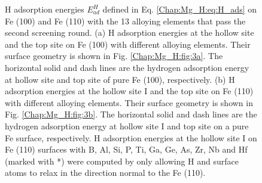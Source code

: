 \newpage
\begingroup
\begin{figure}[!ht]
  \centering
  \label{Chap:Mg_H:fig:8a}
  \label{Chap:Mg_H:fig:8b}
\caption[H adsorption energies on Fe (100) and Fe (110) with the 13 alloying elements that pass the second screening round]{H adsorption energies $E_{ad}^H$ defined in Eq. \ref{Chap:Mg_H:eq:H_ads} on Fe (100) and Fe (110) with the 13 alloying elements that pass the second screening round.  (a) H adsorption energies at the hollow site and the top site on Fe (100) with different alloying elements. Their surface geometry is shown in Fig. \ref{Chap:Mg_H:fig:3a}. The horizontal solid and dash lines are the hydrogen adsorption energy at hollow site and top site of pure Fe (100), respectively. (b) H adsorption energies at the hollow site I and the top site on Fe (110) with different alloying elements. Their surface geometry is shown in Fig. \ref{Chap:Mg_H:fig:3b}. The horizontal solid and dash lines are the hydrogen adsorption energy at hollow site I and top site on a pure Fe surface, respectively. H adsorption energies at the hollow site I on Fe (110) surfaces with B, Al, Si, P, Ti, Ga, Ge, As, Zr, Nb and Hf (marked with *) were computed by only allowing H and surface atoms to relax in the direction normal to the Fe (110).}
  \label{Chap:Mg_H:fig8}
\end{figure}
\endgroup